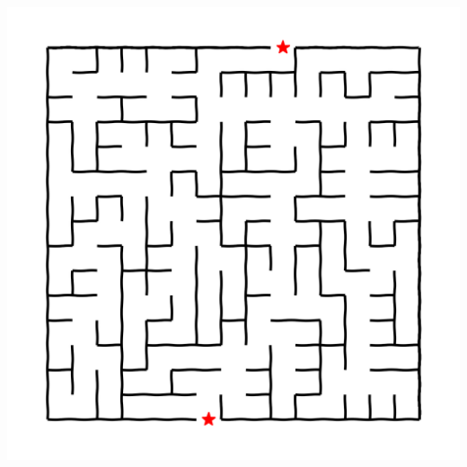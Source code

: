 \documentclass[landscape]{article}
\begin{document}
\begin{multicols}{3}
\center\includegraphics[width=\linewidth]{images/maze_j.png}

\renewcommand*\sudokuformat[1]{\sffamily#1}
\setlength{}
\setlength\sudokuthickline{1pt}
\begin{center}
	
\end{center}
\setnormallinewidth{0.3pt}
\setthicklinewidth{1pt}
\begin{center}
\begin{starbattle}
\framepuzzle

\end{starbattle}
\end{center}


\end{multicols}
\end{document}
